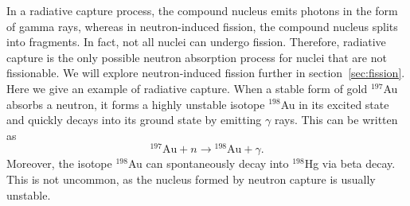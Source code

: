 \documentclass[nofootinbib,preprint,aps]{revtex4-1}
\begin{document}
    In a radiative capture process, the compound nucleus emits photons in the form of gamma rays, whereas in neutron-induced
    fission, the compound nucleus splits into fragments.
    In fact, not all nuclei can undergo fission.
    Therefore, radiative capture is the only possible neutron absorption process for
    nuclei that are not fissionable.\cite{lb01} We will explore neutron-induced fission further in
    section~\ref{sec:fission}. Here we give an example of radiative capture. When a stable form
    of gold ${}^{197}$Au absorbs a neutron, it forms a highly unstable isotope ${}^{198}$Au in its
    excited state and quickly decays into its ground state by emitting $\gamma$ rays. This can be
    written as
    \begin{equation}
        {}^{197}\text{Au} + n \rightarrow {}^{198}\text{Au} + \gamma.
    \end{equation}
    Moreover, the isotope ${}^{198}$Au can spontaneously decay into ${}^{198}$Hg via beta decay. This is not
    uncommon, as the nucleus formed by neutron capture is usually unstable.
\end{document}
